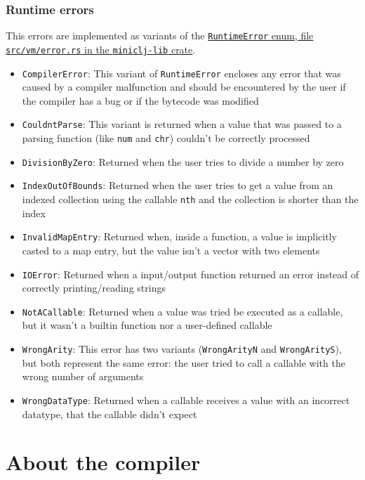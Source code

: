 \documentclass[11pt]{scrreprt}
\begin{document}
\subsection{Runtime errors}
This errors are implemented as variants of the \href{https://github.com/MarioJim/miniclj/blob/263ce60c5847511cdae9b27d79e5db1ae18759a2/miniclj-lib/src/vm/error.rs#L6}{\texttt{RuntimeError} enum, file \texttt{src/vm/error.rs} in the \texttt{miniclj-lib} crate}.
\begin{itemize}
  \item \texttt{CompilerError}: This variant of \texttt{RuntimeError} encloses any error that was caused by a compiler malfunction and should be encountered by the user if the compiler has a bug or if the bytecode was modified
  \item \texttt{CouldntParse}: This variant is returned when a value that was passed to a parsing function (like \texttt{num} and \texttt{chr}) couldn't be correctly processed
  \item \texttt{DivisionByZero}: Returned when the user tries to divide a number by zero
  \item \texttt{IndexOutOfBounds}: Returned when the user tries to get a value from an indexed collection using the callable \texttt{nth} and the collection is shorter than the index
  \item \texttt{InvalidMapEntry}: Returned when, inside a function, a value is implicitly casted to a map entry, but the value isn't a vector with two elements
  \item \texttt{IOError}: Returned when a input/output function returned an error instead of correctly printing/reading strings
  \item \texttt{NotACallable}: Returned when a value was tried be executed as a callable, but it wasn't a builtin function nor a user-defined callable
  \item \texttt{WrongArity}: This error has two variants (\texttt{WrongArityN} and \texttt{WrongArityS}), but both represent the same error: the user tried to call a callable with the wrong number of arguments
  \item \texttt{WrongDataType}: Returned when a callable receives a value with an incorrect datatype, that the callable didn't expect
\end{itemize}


\chapter{About the compiler}
\end{document}

